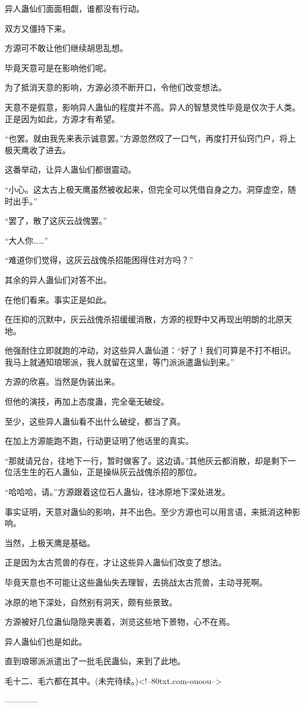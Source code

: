 \begin{this_body}
异人蛊仙们面面相觑，谁都没有行动。

双方又僵持下来。

方源可不敢让他们继续胡思乱想。

毕竟天意可是在影响他们呢。

为了抵消天意的影响，方源必须不断开口，令他们改变想法。

天意不是假意，影响异人蛊仙的程度并不高。异人的智慧灵性毕竟是仅次于人类。正是因为如此，方源才有希望。

“也罢。就由我先来表示诚意罢。”方源忽然叹了一口气，再度打开仙窍门户，将上极天鹰收了进去。

这番举动，让异人蛊仙们都很震动。

“小心。这太古上极天鹰虽然被收起来，但完全可以凭借自身之力。洞穿虚空，随时出手。”

“罢了，散了这灰云战傀罢。”

“大人你……”

“难道你们觉得，这灰云战傀杀招能困得住对方吗？”

其余的异人蛊仙们对答不出。

在他们看来。事实正是如此。

在压抑的沉默中，灰云战傀杀招缓缓消散，方源的视野中又再现出明朗的北原天地。

他强耐住立即就跑的冲动，对这些异人蛊仙道：“好了！我们可算是不打不相识。我马上就通知琅琊派，我人就留在这里，等门派派遣蛊仙到来。”

方源的欣喜。当然是伪装出来。

但他的演技，再加上态度蛊，完全毫无破绽。

至少，这些异人蛊仙看不出什么破绽，都当了真。

在加上方源能跑不跑，行动更证明了他话里的真实。

“那就请兄台，往地下一行，暂时做客了。这边请。”其他灰云都消散，却是剩下一位活生生的石人蛊仙，正是操纵灰云战傀杀招的那位。

“哈哈哈，请。”方源跟着这位石人蛊仙，往冰原地下深处进发。

事实证明，天意对蛊仙的影响，并不出色。至少方源也可以用言语，来抵消这种影响。

当然，上极天鹰是基础。

正是因为太古荒兽的存在，才让这些异人蛊仙们改变了想法。

毕竟天意也不可能让这些蛊仙失去理智，去挑战太古荒兽，主动寻死啊。

冰原的地下深处，自然别有洞天，颇有些景致。

方源被好几位蛊仙隐隐夹裹着，浏览这些地下景物，心不在焉。

异人蛊仙们也是如此。

直到琅琊派派遣出了一批毛民蛊仙，来到了此地。

毛十二、毛六都在其中。(未完待续。)<!--80txt.com-ouoou-->

------------

\end{this_body}

